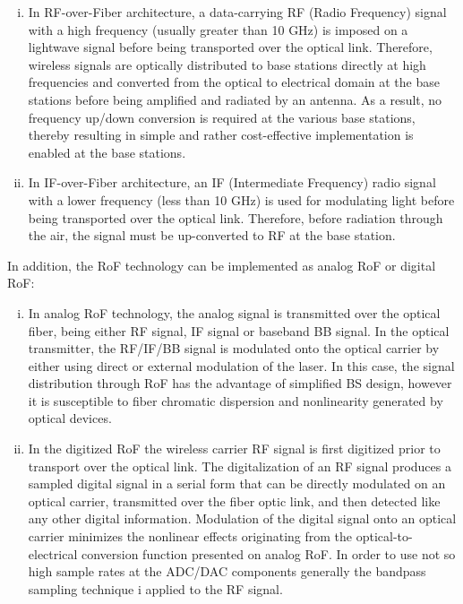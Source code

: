 \begin{enumerate}[(i)]
\item In RF-over-Fiber architecture, a data-carrying RF (Radio Frequency) signal with a high frequency (usually greater than 10 GHz) is imposed on a lightwave signal before being transported over the optical link. Therefore, wireless signals are optically distributed to base stations directly at high frequencies and converted from the optical to electrical domain at the base stations before being amplified and radiated by an antenna. As a result, no frequency up/down conversion is required at the various base stations, thereby resulting in simple and rather cost-effective implementation is enabled at the base stations.
\item In IF-over-Fiber architecture, an IF (Intermediate Frequency) radio signal with a lower frequency (less than 10 GHz) is used for modulating light before being transported over the optical link. Therefore, before radiation through the air, the signal must be up-converted to RF at the base station.
\end{enumerate}
In addition, the RoF technology can be implemented as analog RoF or digital RoF:
\begin{enumerate}[(i)]
\item In analog RoF technology, the analog signal is transmitted over the optical fiber, being either RF signal, IF signal or baseband BB signal. In the optical transmitter, the RF/IF/BB signal is modulated onto the optical carrier by either using direct or external modulation of the laser. In this case, the signal distribution through RoF has the advantage of simplified BS design, however it is susceptible to fiber chromatic dispersion and nonlinearity generated by optical devices.
\item  In the digitized RoF the wireless carrier RF signal is first digitized prior to transport over the optical link. The digitalization of an RF signal produces a sampled digital signal in a serial form that can be directly modulated on an optical carrier, transmitted over the fiber optic link, and then detected like any other digital information. Modulation of the digital signal onto an optical carrier minimizes the nonlinear effects originating from the optical-to-electrical conversion function presented on analog RoF. In order to use not so high sample rates at the ADC/DAC components generally the bandpass sampling technique i applied to the RF signal.

\end{enumerate}

